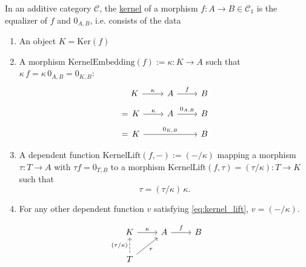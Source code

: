 \begin{definition}[Kernel]
In an additive category $\mathcal{C}$, the \ul{kernel} of a morphism $f : A \rightarrow B \in \mathcal{C}_{1}$ is the equalizer
of $f$ and $0_{A,B}$, i.e. consists of the data
\begin{enumerate}
\renewcommand{\labelenumi}{(\theenumi)}
\item An object $K = \mathrm{Ker}(f)$
\item A morphism $\mathrm{KernelEmbedding}(f) := \kappa : K \rightarrow A$ such that $\kappa\,f = \kappa\,0_{A,B} = 0_{K,B}$:
\begin{align*}
\begin{tikzcd}[
  ampersand replacement=\&,
  row sep=1em,
]
{\phantom{=\, }K} \arrow[r, "\kappa"]                 \& A \arrow[r, "f"] \& B \\
{=\, K} \arrow[r, "\kappa"]   \& A \arrow[r, "0_{A,B}"] \& B \\
{= \, K} \arrow[rr, "{0_{K,B}}"] \&                            \& B
\end{tikzcd}
\end{align*}
\item A dependent function $\mathrm{KernelLift}(f,-) := ( - /\kappa)$ mapping a morphism $\tau : T \rightarrow A$ with $\tau f = 0_{T,B}$ to a
morphism $\mathrm{KernelLift}(f,\tau) = (\tau / \kappa) : T \rightarrow K$ such that
\[
\tau =\label{eq:kernel_lift} (\tau / \kappa)\, \kappa.
\]
\item For any other dependent function $v$ satisfying \eqref{eq:kernel_lift}, $v = ( - / \kappa)$.
\end{enumerate}
\[
\begin{tikzcd}
K \arrow[r, "\kappa"]                            & A \arrow[r, "f"] & B \\
T \arrow[ru, "\tau"'] \arrow[u, "(\tau/\kappa)", dashed] &                  &  
\end{tikzcd}
\]
\end{definition}

